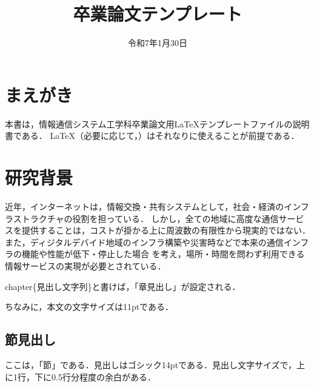 \documentclass[11pt]{icsthesis}
\title{卒業論文テンプレート}
\date{令和7年1月30日}
\begin{document}
\maketitle
\pagestyle{fancy}
\fancyhead[R]{\nouppercase{\fontsize{10.5pt}{0pt}\selectfont\rightmark}}
\fancyhead[L]{\nouppercase{\fontsize{10.5pt}{0pt}\selectfont\leftmark}}
\fancyfoot[C]{--\ \thepage\ --}
\renewcommand{\headrulewidth}{0.3truemm}
\setcounter{tocdepth}{4}
\pagestyle{fancy}
\fancyfoot[C]{--\ \thepage\ --}
{\makeatletter
\let\ps@jpl@in\ps@empty
\makeatother
\pagestyle{plain}
\tableofcontents
\clearpage}

\chapter{まえがき}
本書は，情報通信システム工学科卒業論文用\LaTeX テンプレートファイルの説明書である．
\LaTeX （必要に応じて，\BibTeX）はそれなりに使えることが前提である．

\chapter{研究背景}
近年，インターネットは，情報交換・共有システムとして，社会・経済のインフラストラクチャの役割を担っている．
しかし，全ての地域に高度な通信サービスを提供することは，コストが掛かる上に周波数の有限性から現実的ではない．
また，ディジタルデバイド地域のインフラ構築や災害時などで本来の通信インフラの機能や性能が低下・停止した場合
を考え，場所・時間を問わず利用できる情報サービスの実現が必要とされている．

\textsf{\yen chapter\{見出し文字列\}}と書けば，「章見出し」が設定される．

ちなみに，本文の文字サイズは11ptである．

\section{節見出し}
ここは，「節」である．見出しはゴシック14ptである．見出し文字サイズで，上に1行，下に0.5行分程度の余白がある．
\end{document}
